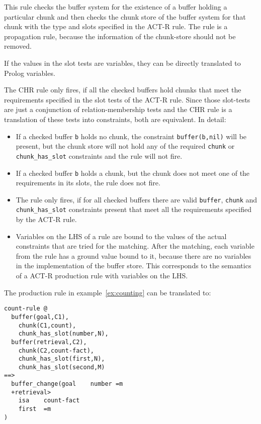 This rule checks the buffer system for the existence of a buffer holding a particular chunk and then checks the chunk store of the buffer system for that chunk with the type and slots specified in the ACT-R rule. The rule is a propagation rule, because the information of the chunk-store should not be removed.

If the values in the slot tests are variables, they can be directly translated to Prolog variables.

The CHR rule only fires, if all the checked buffers hold chunks that meet the requirements specified in the slot tests of the ACT-R rule. Since those slot-tests are just a conjunction of relation-membership tests and the CHR rule is a translation of these tests into constraints, both are equivalent. In detail: 

\begin{itemize}
 \item If a checked buffer \verb|b| holds no chunk, the constraint \verb|buffer(b,nil)| will be present, but the chunk store will not hold any of the required \verb|chunk| or \verb|chunk_has_slot| constraints and the rule will not fire.
 \item If a checked buffer \verb|b| holds a chunk, but the chunk does not meet one of the requirements in its slots, the rule does not fire.
 \item The rule only fires, if for all checked buffers there are valid \verb|buffer|, \verb|chunk| and \verb|chunk_has_slot| constraints present that meet all the requirements specified by the ACT-R rule.
 \item Variables on the LHS of a rule are bound to the values of the actual constraints that are tried for the matching. After the matching, each variable from the rule has a ground value bound to it, because there are no variables in the implementation of the buffer store. This corresponds to the semantics of a ACT-R production rule with variables on the LHS.
\end{itemize}


\begin{example}
The production rule in example~\ref{ex:counting} can be translated to:

\begin{lstlisting}
count-rule @
  buffer(goal,C1), 
    chunk(C1,count),
    chunk_has_slot(number,N),
  buffer(retrieval,C2),
    chunk(C2,count-fact),
    chunk_has_slot(first,N),
    chunk_has_slot(second,M)
==>
  buffer_change(goal    number =m
  +retrieval>
    isa    count-fact
    first  =m
)
\end{lstlisting}

\end{example}


